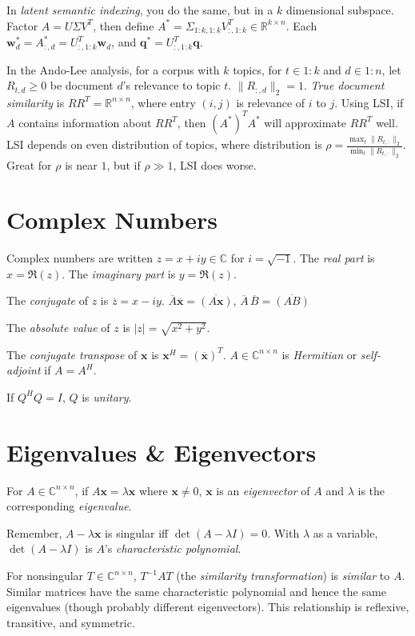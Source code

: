 \documentclass[landscape,10pt,letterpaper]{article}
\newcommand{\heading}[1]{\vspace{-1.5em} \section*{#1} \vspace{-1.0em}}
\begin{document}
\begin{multicols}{4}
In \emph{latent semantic indexing}, you do the same, but in a $k$ dimensional subspace.  Factor $A = U \Sigma V^T$, then define $A^* = \Sigma_{1:k,1:k} V_{:,1:k}^T \in \mathbb{R}^{k \times n}$.  Each $\mathbf{w}_d^* = A^*_{:,d} = U_{:,1:k}^T \mathbf{w}_d$, and $\mathbf{q}^* = U_{:,1:k}^T \mathbf{q}$.

In the Ando-Lee analysis, for a corpus with $k$ topics, for $t \in 1:k$ and $d \in 1:n$, let $R_{t,d} \geq 0$ be document $d$'s relevance to topic $t$.  $\| R_{:,d} \|_2=1$.  \emph{True document similarity} is $RR^T = \mathbb{R}^{n \times n}$, where entry $(i,j)$ is relevance of $i$ to $j$.  Using LSI, if $A$ contains information about $RR^T$, then $(A^*)^T A^*$ will approximate $RR^T$ well.  LSI depends on even distribution of topics, where distribution is $\rho = \frac{\max_t \| R_{t,:} \|_2}{\min_t \| R_{t,:} \|_2}$.  Great for $\rho$ is near $1$, but if $\rho \gg 1$, LSI does worse.

\heading{Complex Numbers}

Complex numbers are written $z = x + iy \in \mathbb{C}$ for $i = \sqrt{-1}$.  The \emph{real part} is $x=\Re(z)$.  The \emph{imaginary part} is $y=\Re(z)$.

The \emph{conjugate} of $z$ is $\overline{z} = x - iy$.  $\overline{A} \overline{\mathbf{x}} = \overline{\left( A \mathbf{x} \right)}$, $\overline{A}\,\overline{B} = \overline{\left( A B \right)}$

The \emph{absolute value} of $z$ is $|z| = \sqrt{x^2 + y^2}$.

The \emph{conjugate transpose} of $\mathbf{x}$ is $\mathbf{x}^H = \left( \overline{\mathbf{x}} \right)^T$.  $A \in \mathbb{C}^{n \times n}$ is \emph{Hermitian} or \emph{self-adjoint} if $A = A^H$.

If $Q^HQ = I$, $Q$ is \emph{unitary}.

\heading{Eigenvalues \& Eigenvectors}

For $A \in \mathbb{C}^{n \times n}$, if $A \mathbf{x} = \lambda \mathbf{x}$ where $\mathbf{x} \neq 0$, $\mathbf{x}$ is an \emph{eigenvector} of $A$ and $\lambda$ is the corresponding \emph{eigenvalue}.

Remember, $A - \lambda \mathbf{x}$ is singular iff $\det(A - \lambda I) = 0$.  With $\lambda$ as a variable, $\det(A - \lambda I)$ is $A$'s \emph{characteristic polynomial}.

For nonsingular $T \in \mathbb{C}^{n \times n}$, $T^{-1} A T$ (the \emph{similarity transformation}) is \emph{similar} to $A$.  Similar matrices have the same characteristic polynomial and hence the same eigenvalues (though probably different eigenvectors).  This relationship is reflexive, transitive, and symmetric.


\end{multicols}
\end{document}
